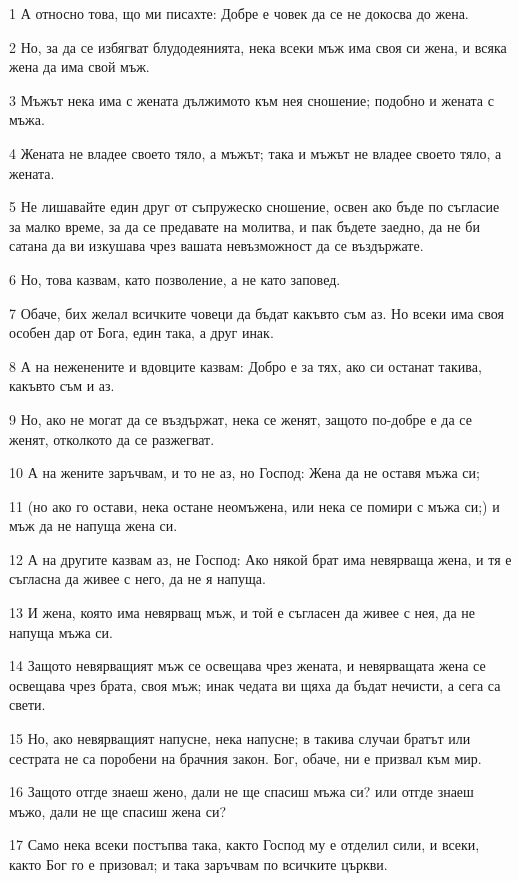 \par 1 А относно това, що ми писахте: Добре е човек да се не докосва до жена.
\par 2 Но, за да се избягват блудодеянията, нека всеки мъж има своя си жена, и всяка жена да има свой мъж.
\par 3 Мъжът нека има с жената дължимото към нея сношение; подобно и жената с мъжа.
\par 4 Жената не владее своето тяло, а мъжът; така и мъжът не владее своето тяло, а жената.
\par 5 Не лишавайте един друг от съпружеско сношение, освен ако бъде по съгласие за малко време, за да се предавате на молитва, и пак бъдете заедно, да не би сатана да ви изкушава чрез вашата невъзможност да се въздържате.
\par 6 Но, това казвам, като позволение, а не като заповед.
\par 7 Обаче, бих желал всичките човеци да бъдат какъвто съм аз. Но всеки има своя особен дар от Бога, един така, а друг инак.
\par 8 А на неженените и вдовците казвам: Добро е за тях, ако си останат такива, какъвто съм и аз.
\par 9 Но, ако не могат да се въздържат, нека се женят, защото по-добре е да се женят, отколкото да се разжегват.
\par 10 А на жените заръчвам, и то не аз, но Господ: Жена да не оставя мъжа си;
\par 11 (но ако го остави, нека остане неомъжена, или нека се помири с мъжа си;) и мъж да не напуща жена си.
\par 12 А на другите казвам аз, не Господ: Ако някой брат има невярваща жена, и тя е съгласна да живее с него, да не я напуща.
\par 13 И жена, която има невярващ мъж, и той е съгласен да живее с нея, да не напуща мъжа си.
\par 14 Защото невярващият мъж се освещава чрез жената, и невярващата жена се освещава чрез брата, своя мъж; инак чедата ви щяха да бъдат нечисти, а сега са свети.
\par 15 Но, ако невярващият напусне, нека напусне; в такива случаи братът или сестрата не са поробени на брачния закон. Бог, обаче, ни е призвал към мир.
\par 16 Защото отгде знаеш жено, дали не ще спасиш мъжа си? или отгде знаеш мъжо, дали не ще спасиш жена си?
\par 17 Само нека всеки постъпва така, както Господ му е отделил сили, и всеки, както Бог го е призовал; и така заръчвам по всичките църкви.
